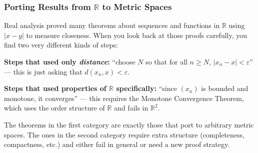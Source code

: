 %

\subsubsection{Porting Results from $\mathbb{R}$ to Metric Spaces}
\label{sec:real-analysis-bridge}

\begin{tcolorbox}[colback=gray!6, colframe=gray!40, arc=2pt,
  left=8pt, right=8pt, top=6pt, bottom=6pt,
  title={\small\textbf{Why abstract this?}},
  fonttitle=\small\bfseries]
Real analysis proved many theorems about sequences and functions in
$\mathbb{R}$ using $|x - y|$ to measure closeness.
When you look back at those proofs carefully, you find two very different
kinds of steps:

\medskip
\noindent
\textbf{Steps that used only \emph{distance}:}
``choose $N$ so that for all $n \ge N$, $|x_n - x| < \varepsilon$'' ---
this is just asking that $d(x_n, x) < \varepsilon$.

\medskip
\noindent
\textbf{Steps that used properties of $\mathbb{R}$ specifically:}
``since $(x_n)$ is bounded and monotone, it converges'' --- this
requires the Monotone Convergence Theorem, which uses the order structure
of $\mathbb{R}$ and fails in $\mathbb{R}^2$.

\medskip
\noindent
The theorems in the first category are exactly those that port
to arbitrary metric spaces.
The ones in the second category require extra structure (completeness, compactness, etc.)
and either fail in general or need a new proof strategy.
\end{tcolorbox}

\bigskip

